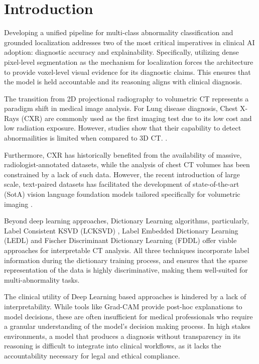 ﻿%
\chapter{Introduction}
Developing a unified pipeline for multi-class abnormality classification and grounded localization
addresses two of the most critical imperatives in clinical AI adoption: diagnostic accuracy and explainability.
Specifically, utilizing dense pixel-level segmentation as the mechanism for localization forces the architecture to
provide voxel-level visual evidence for its diagnostic claims. This ensures that the model is held accountable and its
reasoning aligns with clinical diagnosis.

The transition from 2D projectional radiography to volumetric CT represents a paradigm shift in medical image analysis.
For Lung disease diagnosis, Chest X-Rays (CXR) are commonly used as the first imaging test due to its low cost and low
radiation exposure. However, studies show that their capability to detect abnormailities is limited when compared to 3D CT.
\cite{Self2013401}.

Furthermore, CXR has historically benefited from the availability of massive, radiologist-annotated datasets, while
the analysis of chest CT volumes has been constrained by a lack of such data.
However, the recent introduction of large scale, text-paired datasets has facilitated the development of state-of-the-art
(SotA) vision language foundation models tailored specifically for volumetric imaging \cite{baharoon2025rexgroundingct,flores2016,chen2026dflashblockdiffusionflash}.

Beyond deep learning approaches, Dictionary Learning algorithms, particularly, Label Consistent KSVD (LCKSVD) \cite{jiang2013lcksvd},
Label Embedded Dictionary Learning (LEDL) and Fischer Discriminant Dictionary Learning (FDDL)
offer viable approaches for interpretable CT analysis. All three techniques incorporate label information during the dictionary training
process, and ensures that the sparse representation of the data is highly discriminative, making them
well-suited for multi-abnormality tasks.

The clinical utility of Deep Learning based approaches is hindered by a lack of interpretability. While tools like Grad-CAM
provide post-hoc explanations to model decisions, these are often insufficient for medical professionals who require a granular
understanding of the model's decision making process. In high stakes environments, a model that produces a diagnosis without
transparency in its reasoning is difficult to integrate into clinical workflows, as it lacks the accountability necessary for
legal and ethical compliance.

